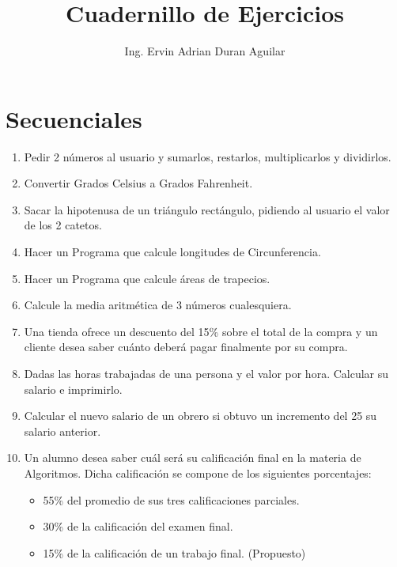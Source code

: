 \documentclass{scrartcl}
\title{Cuadernillo de Ejercicios}
\author{Ing. Ervin Adrian Duran Aguilar}
\date{}
\begin{document}
	\maketitle
	\section{Secuenciales}
	
	\begin{enumerate}
		
		\item Pedir 2 números al usuario y sumarlos, restarlos, multiplicarlos y dividirlos.
		
		\item Convertir Grados Celsius a Grados Fahrenheit.
		
		\item Sacar la hipotenusa de un triángulo rectángulo, pidiendo al usuario el valor de los 2 catetos.
		
		\item Hacer un Programa que calcule longitudes de Circunferencia.

		\item Hacer un Programa que calcule áreas de trapecios.
		
		\item Calcule la media aritmética de 3 números cualesquiera.
		
		\item Una tienda ofrece un descuento del 15\% sobre el total de la compra y un cliente desea saber cuánto deberá pagar finalmente por su compra.
		
		\item Dadas las horas trabajadas de una persona y el valor por hora. Calcular su
		salario e imprimirlo.
		
		\item Calcular el nuevo salario de un obrero si obtuvo un incremento del 25%
		su salario anterior.
		
		\item Un alumno desea saber cuál será su calificación final en la materia de	Algoritmos. Dicha calificación se compone de los siguientes porcentajes:
		
			\begin{itemize}
					\item 55\% del promedio de sus tres calificaciones parciales.
					\item 30\% de la calificación del examen final.
					\item 15\% de la calificación de un trabajo final. (Propuesto)				
			\end{itemize}


\end{enumerate}
\end{document}
